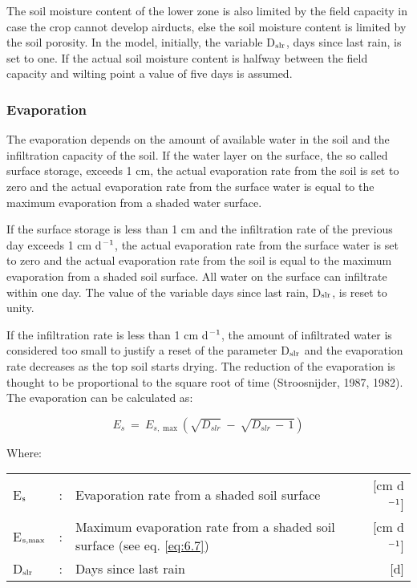 The soil moisture content of the lower zone is also limited by the field capacity in case
the crop cannot develop airducts, else the soil moisture content is limited by the soil
porosity. In the model, initially, the variable D$_{{\rm slr}}$, days since last rain, is set 
to one. If the
actual soil moisture content is halfway between the field capacity and wilting point a
value of five days is assumed. 

\subsubsection{Evaporation}
The evaporation depends on the amount of available water in the soil and the infiltration
capacity of the soil. If the water layer on the surface, the so called surface storage, 
exceeds 1 cm, the actual evaporation rate from the soil is set to zero and the actual
evaporation rate from the surface water is equal to the maximum evaporation from a
shaded water surface.

If the surface storage is less than 1 cm and the infiltration rate of the previous day
exceeds 1 cm d$^{{\rm -1}}$, the actual evaporation rate from the surface water is set to zero and the
actual evaporation rate from the soil is equal to the maximum evaporation from a shaded
soil surface. All water on the surface can infiltrate within one day. The value of the
variable days since last rain, D$_{{\rm slr}}$, is reset to unity.

If the infiltration rate is less than 1 cm d$^{{\rm -1}}$, the amount of infiltrated water is considered
too small to justify a reset of the parameter D$_{{\rm slr}}$ and the evaporation rate decreases as the
top soil starts drying. The reduction of the evaporation is thought to be proportional to the
square root of time (Stroosnijder, 1987, 1982). The evaporation can be calculated as:

\begin{equation}
\label{eq:6.20}
E _{s} ~=~ E _{s,\max } ( \sqrt{D _{slr} } ~-~ \sqrt{D _{slr} \, -\, 1} )
\end{equation}

Where:\\[5pt]
\begin{tabularx}{\textwidth}{llXr}
	E$_{{\rm s}}$ &:& Evaporation rate from a shaded soil surface  & [cm d$^{{\rm -1}}$]\\
	E$_{{\rm s,max}}$ &:& Maximum evaporation rate from a shaded soil
	surface (see eq. \ref{eq:6.7})  & [cm d$^{{\rm -1}}$]\\
	D$_{{\rm slr}}$ &:& Days since last rain  & [d]\\
\end{tabularx}

